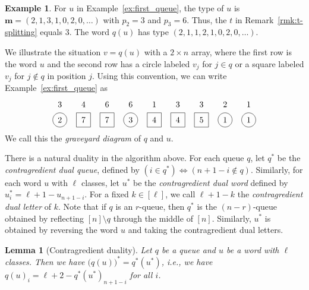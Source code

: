 \documentclass[reqno]{amsart}
\newcommand{\0}{\phantom{c}}
\newcommand{\mm}{\mathbf{m}}
\newcommand{\tup}[1]{\left( #1 \right)}
\newcommand{\ive}[1]{\left[ #1 \right]}
\newcommand{\defn}[1]{{\color{darkred}\emph{#1}}} %
\theoremstyle{plain}
\newtheorem{lemma}[thm]{Lemma}
\theoremstyle{definition}
\newtheorem{example}[thm]{Example}
\numberwithin{equation}{section}
\begin{document}
\begin{example}
For $u$ in Example~\ref{ex:first_queue}, the type of $u$ is $\mm = (2, 1, 3, 1, 0, 2, 0, \ldots)$ with $p_2 = 3$ and $p_3 = 6$.
Thus, the $t$ in Remark~\ref{rmk:t-splitting} equals $3$.
The word $q(u)$ has type $(2,1,1,2,1,0,2,0,\ldots)$.
\end{example}

We illustrate the situation $v = q(u)$ with a $2 \times n$ array, where the first row is the word $u$
and the second row has a circle labeled $v_j$ for $j \in q$ or a square labeled $v_j$ for $j \notin q$ in position $j$.
Using this convention, we can write Example~\ref{ex:first_queue} as
\begin{equation}
\begin{tikzpicture}[baseline=10]
  \def\ll{0.65}   %
  \foreach \i in {5,9} { \node at (\i,\ll) {$1$}; }
  \foreach \i in {8} { \node at (\i,\ll) {$2$}; }
  \foreach \i in {1,6,7} { \node at (\i,\ll) {$3$}; }
  \foreach \i in {2} { \node at (\i,\ll) {$4$}; }
  \foreach \i in {3,4} { \node at (\i,\ll) {$6$}; }
  \foreach \i in {1,4,8,9} { \draw (\i,0) circle (0.3); }
  \foreach \i in {2,3,5,6,7} { \draw (\i-.3,0-.3) rectangle +(0.6,+0.6); }
  \foreach \i in {8,9} { \node at (\i,0) {$1$}; }
  \foreach \i in {1} { \node at (\i,0) {$2$}; }
  \foreach \i in {4} { \node at (\i,0) {$3$}; }
  \foreach \i in {5,6} { \node at (\i,0) {$4$}; }
  \foreach \i in {7} { \node at (\i,0) {$5$}; }
  \foreach \i in {2,3} { \node at (\i,0) {$7$}; }
\end{tikzpicture}
\label{eq:boxes-and-balls-1}
\end{equation}
We call this the \defn{graveyard diagram} of $q$ and $u$.

There is a natural duality in the algorithm above.
For each queue $q$, let $q^*$ be the \defn{contragredient dual queue}, defined by $\tup{i \in q^*} \Longleftrightarrow \tup{n+1-i \notin q}$.
Similarly, for each word $u$ with $\ell$ classes, let $u^*$ be the \defn{contragredient dual word} defined by $u^*_i = \ell + 1 - u_{n+1-i}$.
For a fixed $k \in \ive{\ell}$, we call $\ell + 1 - k$ the \defn{contragredient dual letter} of $k$.
Note that if $q$ is an $r$-queue, then $q^*$ is the $(n-r)$-queue obtained by reflecting $[n] \setminus q$ through the middle of $[n]$.
Similarly, $u^*$ is obtained by reversing the word $u$ and taking the contragredient dual letters.

\begin{lemma}[Contragredient duality]
  \label{le:dual}
  Let $q$ be a queue and $u$ be a word with $\ell$ classes.
  Then we have $\bigl(q(u) \bigr)^* = q^*(u^*)$, \textit{i.e.}, we have $q(u)_i = \ell + 2 - q^*(u^*)_{n+1-i}$ for all $i$.
\end{lemma}
\end{document}
